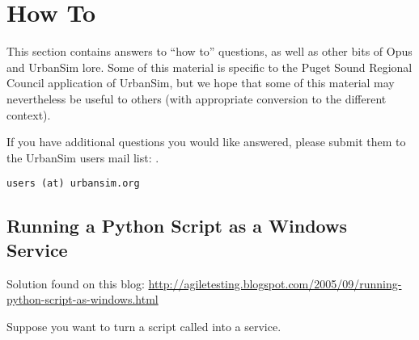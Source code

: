 

\chapter{How To}

This section contains answers to ``how to'' questions, as well as other
bits of Opus and UrbanSim lore.  Some of this material is specific to the Puget
Sound Regional Council \psrcindex application of UrbanSim, but we hope that some
of this material may nevertheless be useful to others (with appropriate
conversion to the different context).

If you have additional questions you would like answered, please submit them to 
the UrbanSim users mail list:
.
\begin{htmlonly}
{\tt users (at) urbansim.org}
\end{htmlonly}

\section{Running a Python Script as a Windows Service}
\pythonindex\windowsindex
 
Solution found on this blog: 
\url{http://agiletesting.blogspot.com/2005/09/running-python-script-as-windows.html}

Suppose you want to turn a script called  into a service.

